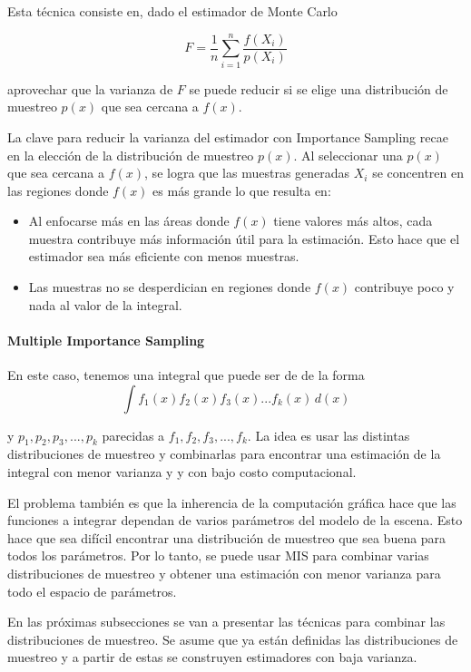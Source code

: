 \documentclass{article}
\begin{document}
Esta técnica consiste en, dado el estimador de Monte Carlo

$$ F = \frac{1}{n} \sum_{i=1}^{n} \frac{f(X_{i})}{p(X_{i})}$$

aprovechar que la varianza de $F$ se puede reducir si se elige una distribución de muestreo $p(x)$ que sea cercana a $f(x)$.

La clave para reducir la varianza del estimador con Importance Sampling recae en la elección de la distribución de muestreo $p(x)$.
Al seleccionar una $p(x)$ que sea cercana a $f(x)$, se logra que las muestras generadas $X_{i}$ se concentren en las regiones donde $f(x)$ es más grande lo que resulta en:

\begin{itemize}
    \item Al enfocarse más en las áreas donde $f(x)$ tiene valores más altos, cada muestra contribuye más información útil para la estimación.
          Esto hace que el estimador sea más eficiente con menos muestras.
    \item Las muestras no se desperdician en regiones donde $f(x)$ contribuye poco y nada al valor de la integral.
\end{itemize}

\paragraph{Multiple Importance Sampling}

En este caso, tenemos una integral que puede ser de de la forma
$$ \int f_{1}(x) f_{2}(x) f_{3}(x) ... f_{k}(x) \,d(x)$$

y $ p_{1}, p_{2}, p_{3}, ..., p_{k}$ parecidas a $f_{1}, f_{2}, f_{3}, ..., f_{k}$.
La idea es usar las distintas distribuciones de muestreo y combinarlas para encontrar una estimación de la integral con menor varianza y y con bajo costo computacional.

El problema también es que la inherencia de la computación gráfica hace que las funciones a integrar dependan de varios parámetros del modelo de la escena.
Esto hace que sea difícil encontrar una distribución de muestreo que sea buena para todos los parámetros.
Por lo tanto, se puede usar MIS para combinar varias distribuciones de muestreo y obtener una estimación con menor varianza para todo el espacio de parámetros.

En las próximas subsecciones se van a presentar las técnicas para combinar las distribuciones de muestreo.
Se asume que ya están definidas las distribuciones de muestreo y a partir de estas se construyen estimadores con baja varianza.
\end{document}
